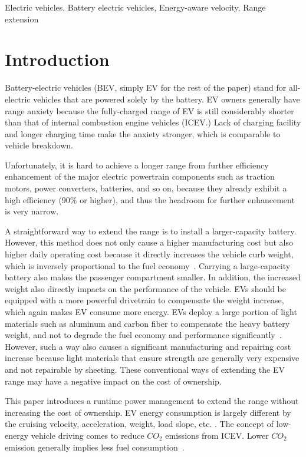 \documentclass{IEEEtran}
\begin{document}
\begin{IEEEkeywords}
Electric vehicles, Battery electric vehicles, Energy-aware velocity, Range extension
\end{IEEEkeywords}
\section{Introduction}

Battery-electric vehicles (BEV, simply EV for the rest of the paper) stand for all-electric vehicles that are powered solely by the battery. EV owners generally have range anxiety because the fully-charged range of EV is still considerably shorter than that of internal combustion engine vehicles (ICEV.) Lack of charging facility and longer charging time make the anxiety stronger, which is comparable to vehicle breakdown.

Unfortunately, it is hard to achieve a longer range from further efficiency enhancement of the major electric powertrain components such as traction motors, power converters, batteries, and so on, because they already exhibit a high efficiency (90\% or higher), and thus the headroom for further enhancement is very narrow.

A straightforward way to extend the range is to install a larger-capacity battery. However, this method does not only cause a higher manufacturing cost but also higher daily operating cost because it  directly increases the vehicle curb weight, which is inversely proportional to the fuel economy~\cite{Hong:ASPDAC16}. Carrying a large-capacity battery also makes the passenger compartment smaller. In addition, the increased weight also directly impacts on the performance of the vehicle. 
EVs should be equipped with a more powerful drivetrain to compensate the weight increase, which again makes EV consume more energy. 
EVs deploy a large portion of light materials such as aluminum and carbon fiber to compensate the heavy battery weight, and not to degrade the fuel economy and performance significantly~\cite{Chang:ICCAD14}. However, such a way also causes a significant manufacturing and repairing cost increase because light materials that ensure strength are generally very expensive and not repairable by sheeting. These conventional ways of extending the EV range may have a negative impact on the cost of ownership.

This paper introduces a runtime power management to extend the range without increasing the cost of ownership. EV energy consumption is largely different by the cruising velocity, acceleration, weight, load slope, etc. \cite{Chang:ICCAD14}. The concept of low-energy vehicle driving comes to reduce $CO_2$ emissions from ICEV. Lower  $CO_2$ emission generally implies less fuel consumption~\cite{Seraens:thesis12}. 
\end{document}
